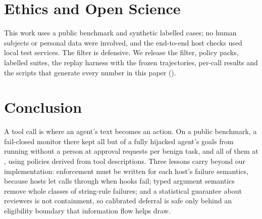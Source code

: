 \section{Ethics and Open Science}
This work uses a public benchmark and synthetic labelled cases; no human subjects or personal data were involved, and the end-to-end host checks used local test services. The filter is defensive. We release the filter, policy packs, labelled suites, the replay harness with the frozen trajectories, per-call results and the scripts that generate every number in this paper (\ArtifactURL).

\section{Conclusion}
A tool call is where an agent's text becomes an action. On a public benchmark, a fail-closed monitor there kept all but \AdTiersGoalUnreviewed{} of a fully hijacked agent's goals from running without a person at \AdTiersAsks{} approval requests per benign task, and all of them at \AdConsAsks{}, using policies derived from tool descriptions. Three lessons carry beyond our implementation: enforcement must be written for each host's failure semantics, because hosts let calls through when hooks fail; typed argument semantics remove whole classes of string-rule failures; and a statistical guarantee about reviewers is not containment, so calibrated deferral is safe only behind an eligibility boundary that information flow helps draw.
